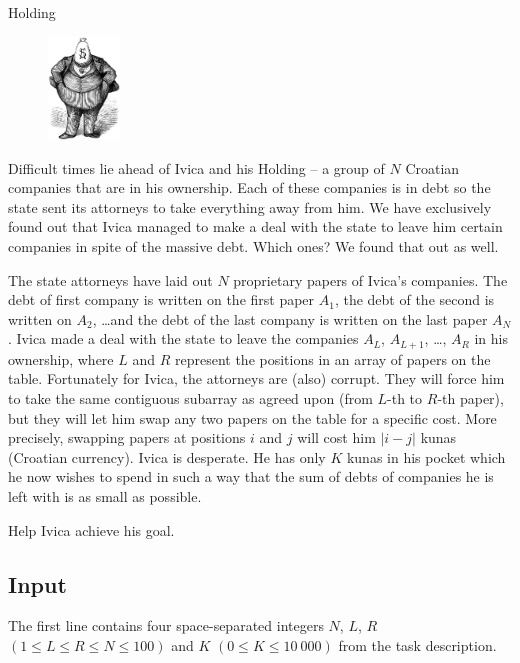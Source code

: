 \begin{statement}[
  problempoints=110,
  timelimit=1 second,
  memorylimit=512 MiB,
]{Holding}

\setlength\intextsep{-0.1cm}
\begin{figure}
\centering
\includegraphics[width=0.17\textwidth]{img/holding.png}
\end{figure}

Difficult times lie ahead of Ivica and his Holding -- a group of $N$ Croatian
companies that are in his ownership. Each of these companies is in debt so the
state sent its attorneys to take everything away from him. We have exclusively
found out that Ivica managed to make a deal with the state to leave him certain
companies in spite of the massive debt. Which ones? We found that out as well.

The state attorneys have laid out $N$ proprietary papers of Ivica's companies.
The debt of first company is written on the first paper $A_1$, the debt of the
second is written on $A_2$, \dots and the debt of the last company is written
on the last paper $A_N$. Ivica made a deal with the state to leave the companies
$A_L$, $A_{L+1}$, \dots , $A_R$ in his ownership, where $L$ and $R$ represent
the positions in an array of papers on the table. Fortunately for Ivica, the
attorneys are (also) corrupt. They will force him to take the same contiguous
subarray as agreed upon (from $L$-th to $R$-th paper), but they will let him
swap any two papers on the table for a specific cost. More precisely, swapping
papers at positions $i$ and $j$ will cost him $|i-j|$ kunas (Croatian currency).
Ivica is desperate. He has only $K$ kunas in his pocket which he now wishes to
spend in such a way that the sum of debts of companies he is left with is as
small as possible.

Help Ivica achieve his goal.

\subsection*{Input}
The first line contains four space-separated integers $N$, $L$, $R$
$(1 \le L \le R \le N \le 100)$ and $K$ $(0 \le K \le 10\ 000)$ from the
task description.


\end{statement}
